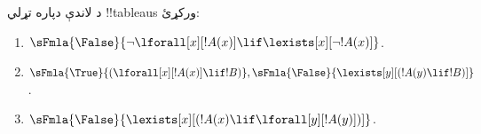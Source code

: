 \documentclass[../../../include/open-logic-section]{subfiles}
\begin{document}
\begin{prob}
د لاندې دپاره تړلي !!{tableau}s ورکړئ:
\begin{enumerate}
\item $\sFmla{\False}{\lnot\lforall[x][!A(x)] \lif \lexists[x][\lnot!A(x)]}$.
\item $\sFmla{\True}{(\lforall[x][!A(x)] \lif !B)}, \sFmla{\False}{\lexists[y][(!A(y) \lif !B)]}$.
\item $\sFmla{\False}{\lexists[x][(!A(x) \lif \lforall[y][!A(y)])]}$.
\end{enumerate}
\end{prob}
\end{document}

